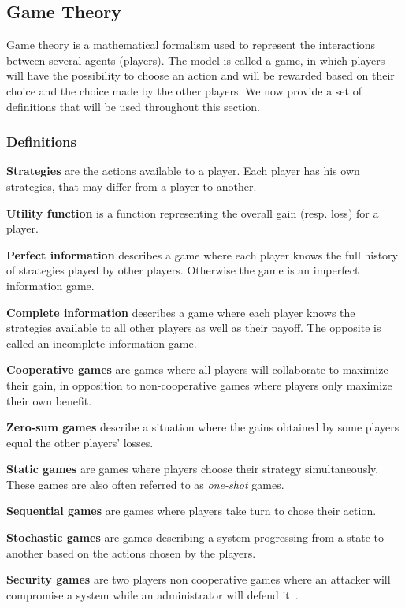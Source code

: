 \subsection{Game Theory}

Game theory is a mathematical formalism used to represent the interactions between several agents (\ie players).
The model is called a game, in which players will have the possibility to choose an action and will be rewarded based on their choice and the choice made by the other players.
We now provide a set of definitions that will be used throughout this section.

\subsubsection{Definitions}

\textbf{Strategies} are the actions available to a player. Each player has his own strategies, that may differ from a player to another.

\textbf{Utility function} is a function representing the overall gain (resp. loss) for a player.

\textbf{Perfect information} describes a game where each player knows the full history of strategies played by other players. Otherwise the game is an imperfect information game.

\textbf{Complete information} describes a game where each player knows the strategies available to all other players as well as their payoff. The opposite is called an incomplete information game.

\textbf{Cooperative games} are games where all players will collaborate to maximize their gain, in opposition to non-cooperative games where players only maximize their own benefit.

\textbf{Zero-sum games} describe a situation where the gains obtained by some players equal the other players' losses.

\textbf{Static games} are games where players choose their strategy simultaneously. These games are also often referred to as \textit{one-shot} games.

\textbf{Sequential games} are games where players take turn to chose their action.

\textbf{Stochastic games} are games describing a system progressing from a state to another based on the actions chosen by the players.

\textbf{Security games} are two players non cooperative games where an attacker will compromise a system while an administrator will defend it~\cite{book-gt}.

